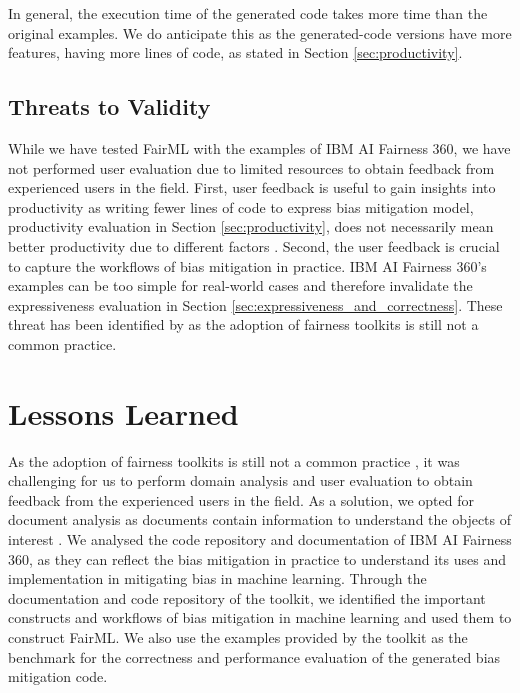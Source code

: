 \documentclass[sigconf,review]{acmart}
\begin{document}
{	In general, the execution time of the generated code takes more time than the original examples. 
	We do anticipate this as the generated-code versions have more features, having more lines of code,
	as stated in Section \ref{sec:productivity}. 
	
	\subsection{Threats to Validity}
	\label{sec:threats_to_validity}	
	While we have tested FairML with the examples of IBM AI Fairness 360, we have not performed user evaluation due to limited resources to obtain feedback from experienced users in the field. First, user feedback is useful to gain insights into productivity as writing fewer lines of code to express bias mitigation model, productivity evaluation in Section \ref{sec:productivity}, does not necessarily mean better productivity due to different factors \cite{sadowski2019rethinking}. Second, the user feedback is crucial to capture the workflows of bias mitigation in practice. IBM AI Fairness 360's examples can be too simple for real-world cases and therefore invalidate the expressiveness evaluation in Section \ref{sec:expressiveness_and_correctness}. These threat has been identified by \cite{lee2021landscape} as the adoption of fairness toolkits is still not a common practice.
	
	\section{Lessons Learned}
	\label{sec:lessons_learned}
	As the adoption of fairness toolkits is still not a common practice \cite{lee2021landscape}, it was challenging for us to perform domain analysis and user evaluation to obtain feedback from the experienced users in the field. As a solution, we opted for document analysis as documents contain information to understand the objects of interest \cite{bowen2009document}. We analysed the code repository and documentation of IBM AI Fairness 360, as they can reflect the bias mitigation in practice to understand its uses and implementation in mitigating bias in machine learning. Through the documentation and code repository of the toolkit, we identified the important constructs and workflows of bias mitigation in machine learning and used them to construct FairML. We also use the examples provided by the toolkit as the benchmark for the correctness and performance evaluation of the generated bias mitigation code. 
	
}
\end{document}
